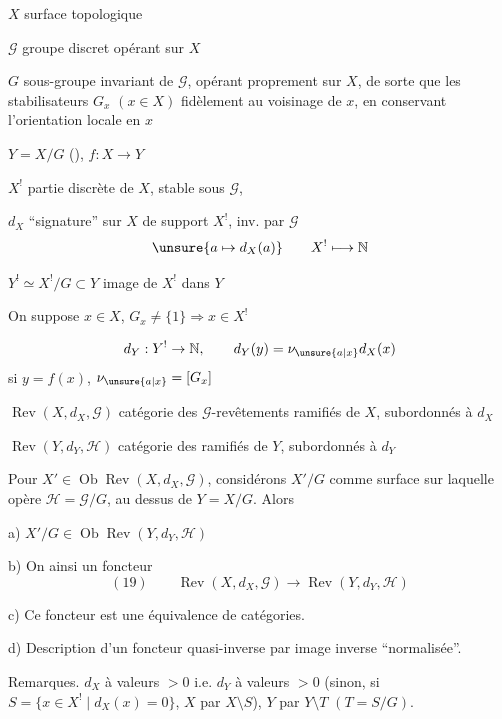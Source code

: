 
$X$ surface topologique

$\mathcal{G}$ groupe discret opérant sur $X$

$G$ sous-groupe invariant de $\mathcal{G}$, opérant proprement sur $X$, de sorte que
 les stabilisateurs $G_x$ $(x\in X)$  fidèlement au voisinage de $x$, en conservant l'orientation locale en $x$

$Y=X/G$ (), $f:X\to Y$

$X^{!}$ partie discrète de $X$, stable sous $\mathcal{G}$,

$d_X$ ``signature'' sur $X$ de support $X^{!}$, inv. par $\mathcal{G}$
\[
\unsure{a\mapsto d_X(a)}\qquad X^{!}\longmapsto\mathbb{N}
\]

$Y^{!}\simeq X^{!}/G\subset Y$ image de $X^{!}$ dans $Y$

On suppose $x\in X$, $G_x\ne\{1\}\Rightarrow x\in X^{!}$

\[
d_Y:Y^{!}\to\mathbb{N},\qquad d_Y(y)=\nu_{\unsure{a|x}}d_X(x)
\]
si $y=f(x)$, $\nu_{\unsure{a|x}}=[G_x]$

$\operatorname{Rev}(X,d_X,\mathcal{G})$ catégorie des $\mathcal{G}$-revêtements ramifiés de $X$, subordonnés à $d_X$

$\operatorname{Rev}(Y,d_Y,\mathcal{H})$ catégorie des  ramifiés de $Y$, subordonnés à $d_Y$

Pour $X'\in\operatorname{Ob}\operatorname{Rev}(X,d_X,\mathcal{G})$, considérons $X'/G$ comme surface sur laquelle opère $\mathcal{H}=\mathcal{G}/G$, au dessus de $Y=X/G$. Alors



a) $X'/G\in\operatorname{Ob}\operatorname{Rev}(Y,d_Y,\mathcal{H})$

b) On  ainsi un foncteur
\[
(19)\qquad\operatorname{Rev}(X,d_X,\mathcal{G})\longrightarrow\operatorname{Rev}(Y,d_Y,\mathcal{H})
\]

c) Ce foncteur est une équivalence de catégories.

d) Description d'un foncteur quasi-inverse par image inverse ``normalisée''.

Remarques.  $d_X$ à valeurs $>0$ i.e. $d_Y$ à valeurs $>0$ (sinon, si $S=\{x\in X^{!}\mid d_X(x)=0\}$,  $X$ par $X\setminus S$), $Y$ par $Y\setminus T$ $(T=S/G)$.

